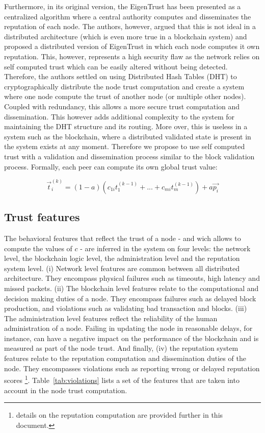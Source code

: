 \documentclass[]{article}
\begin{document}
Furthermore, in its original version, the EigenTrust has been presented as a centralized algorithm where a central authority computes and disseminates the reputation of each node. The authors, however, argued that this is not ideal in a distributed architecture (which is even more true in a blockchain system) and proposed a distributed version of EigenTrust in which each node computes it own reputation. This, however, represents a high security flaw as the network relies on self computed trust which can be easily altered without being detected. Therefore, the authors settled on using Distributed Hash Tables (DHT) to cryptographically distribute the node trust computation and create a system where one node compute the trust of another node (or multiple other nodes). Coupled with redundancy, this allows a more secure trust computation and dissemination. This however adds additional complexity to the system for maintaining the DHT structure and its routing. More over, this is useless in a system such as the blockchain, where a distributed validated state is present in the system exists at any moment. Therefore we propose to use self computed trust with a validation and dissemination process similar to the block validation process. Formally, each peer can compute its own global trust value:

\begin{equation}
   \vec{t}^{(k)}_i = (1 - a)(c_{1i}t^{(k-1)}_1 + ... + c_{mi}t^{(k-1)}_m)  + a\vec{p_i}
\end{equation}

\subsection{Trust features}
The behavioral features that reflect the trust of a node - and wich allows to compute the values of $c$ - are inferred in the system on four levels: the network level, the blockchain logic level, the administration level and the reputation system level. (i) Network level features are common between all distributed architecture. They encompass physical failures such as timeouts, high latency and missed packets. (ii) The blockchain level features relate to the computational and decision making duties of a node. They encompass failures such as delayed block production, and violations such as validating bad transaction and blocks. (iii) The administration level  features reflect the reliability of the human administration of a node. Failing in updating the node in reasonable delays, for instance, can have a negative impact on the performance of the blockchain and is measured as part of the node trust. And finally, (iv) the reputation system features relate to the reputation computation and dissemination duties of the node. They encompasses violations such as reporting wrong or delayed reputation scores \footnote{details on the reputation computation are provided further in this document.}. Table~\ref{tab:violations} lists a set of the features that are taken into account in the node trust computation.
\end{document}
